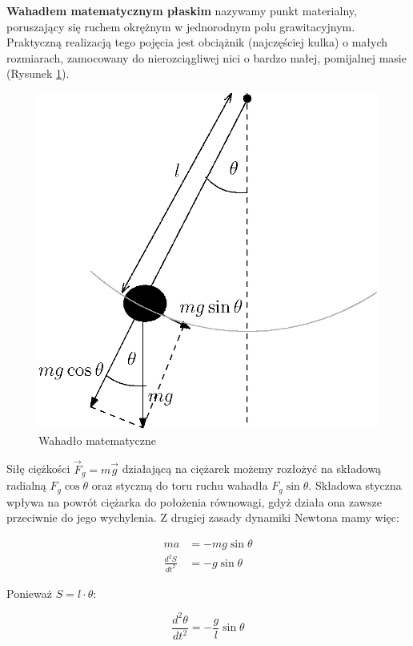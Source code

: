\documentclass[a4paper]{article}
\begin{document}
\textbf{Wahadłem matematycznym płaskim} nazywamy punkt materialny, poruszający się
ruchem okrężnym w jednorodnym polu grawitacyjnym. Praktyczną realizacją tego pojęcia
jest obciążnik (najczęściej kulka) o małych rozmiarach, zamocowany do nierozciągliwej
nici o bardzo małej, pomijalnej masie (Rysunek \ref{wahadlo_matematyczne}).

\begin{figure}[h!]
\centering
\includegraphics[scale=0.8]{wahadlo.eps}
\caption{Wahadło matematyczne}
\label{wahadlo_matematyczne}
\end{figure}

Siłę ciężkości $\vec{F}_g = m\vec{g}$ działającą na ciężarek możemy rozłożyć na
składową radialną $F_g \cos \theta$ oraz styczną do toru ruchu wahadła $F_g \sin \theta$.
Składowa styczna wpływa na powrót ciężarka do położenia równowagi, gdyż działa ona
zawsze przeciwnie do jego wychylenia. Z drugiej zasady dynamiki Newtona mamy więc:

\begin{align*}
 ma &= -mg\sin\theta \\
 \frac{d^2S}{dt^2} &= -g\sin\theta
\end{align*}

Ponieważ $S = l \cdot \theta$:

\[ \frac{d^2\theta}{dt^2} = -\frac{g}{l}\sin\theta \]
\end{document}
